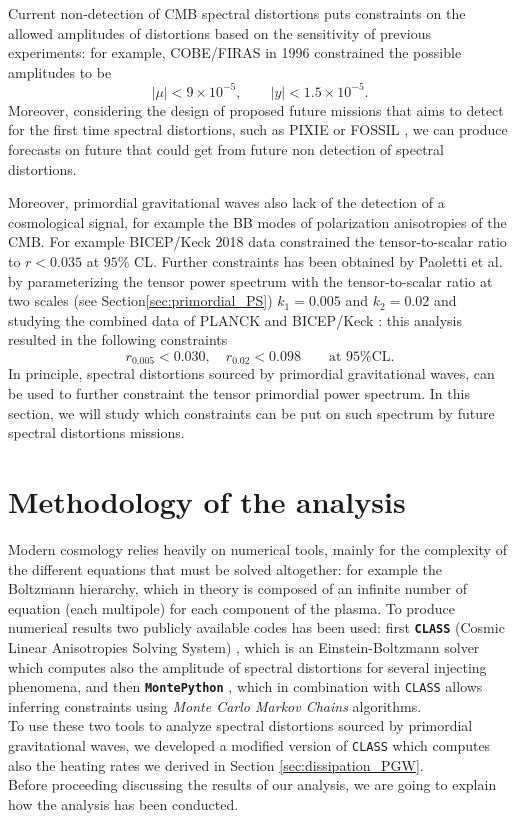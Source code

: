 \label{chap:constr}
Current non-detection of CMB spectral distortions puts constraints on the allowed amplitudes of distortions based on the sensitivity of previous experiments: for example, COBE/FIRAS \cite{COBE1996} in 1996 constrained the possible amplitudes to be 
\begin{equation}
    |\mu|<9\times10^{-5}, \qquad  |y|<1.5\times 10^{-5}.
\end{equation}
Moreover, considering the design of proposed future missions that aims to detect for the first time spectral distortions, such as PIXIE \cite{pixie} or FOSSIL \cite{IAS_Fossil}, we can produce forecasts on future that could get from future non detection of spectral distortions.

Moreover, primordial gravitational waves also lack of the detection of a cosmological signal, for example the BB modes of polarization anisotropies of the CMB. For example BICEP/Keck 2018 data \cite{Ade_2021} constrained the  tensor-to-scalar ratio to $r<0.035$ at $95\%$ CL. Further constraints has been obtained by Paoletti et al. \cite{Paoletti_2022} by parameterizing the tensor power spectrum with the tensor-to-scalar ratio at two scales (see  Section\ref{sec:primordial_PS}) $k_1=0.005$ and $k_2=0.02$ and studying the combined data of PLANCK \cite{planck2018results} and BICEP/Keck \cite{Ade_2021}: this analysis resulted in the following constraints
\begin{equation}
    r_{0.005}<0.030,\quad r_{0.02}<0.098\qquad\text{at 95\% CL.}
\end{equation}
In principle, spectral distortions sourced by primordial gravitational waves, can be used to further constraint the tensor primordial power spectrum. In this section, we will study which constraints can be put on such spectrum by future spectral distortions missions.
\section{Methodology of the analysis}
Modern cosmology relies heavily on numerical tools, mainly for the complexity of the different equations that must be solved altogether: for example the Boltzmann hierarchy, which in theory is composed of an infinite number of equation (each multipole) for each component of the plasma.
To produce numerical results two publicly available codes has been used: first \textbf{\texttt{CLASS}} (Cosmic Linear Anisotropies Solving System) \cite{CLASS}, which is an Einstein-Boltzmann solver which computes also the amplitude of spectral distortions for several injecting phenomena, and then \textbf{\texttt{MontePython}} \cite{Brinckmann:2018cvx,Audren:2012wb}, which in combination with \texttt{CLASS} allows inferring constraints using \emph{Monte Carlo Markov Chains} algorithms.\\
To use these two tools to analyze spectral distortions sourced by primordial gravitational waves, we developed a modified version of \texttt{CLASS} which computes also the heating rates we derived in Section \ref{sec:dissipation_PGW}. \\
Before proceeding discussing the results of our analysis, we are going to explain how the analysis has been conducted.
